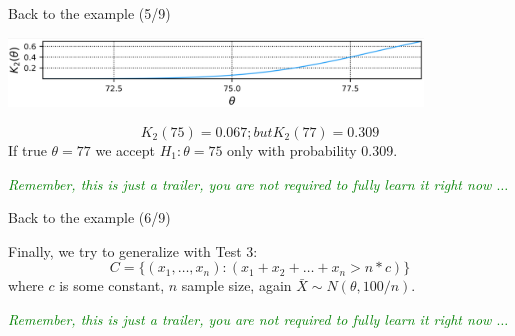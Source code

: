 \documentclass{beamer}
\begin{document}


\begin{frame}
{\centerline{Back to the example (5/9)}}


\begin{center}
  
\includegraphics[width=11cm]{A2022.IDSEPC.SperimentazioneDeduzione/k2.png}
\end{center}

$$K_2(75) = 0.067; but K_2(77) = 0.309$$
If true $\theta = 77$ we accept $H_1: \theta = 75$ only with probability 0.309.

\vspace*{1cm}
\begin{center}
\textcolor{green}{\textit{Remember, this is just a trailer, you are not required to fully learn it right now $\ldots{}$}}
\end{center}

\end{frame}




\begin{frame}
{\centerline{Back to the example (6/9)}}
Finally, we try to generalize with Test 3:
$$C = \{ (x_1,\ldots, x_n): (x_1 + x_2 + \ldots + x_n > n*c) \}$$
where $c$ is some constant, $n$ sample size, again $\bar{X} \sim N(\theta, 100/n)$.

\vspace*{1cm}
\begin{center}
\textcolor{green}{\textit{Remember, this is just a trailer, you are not required to fully learn it right now $\ldots{}$}}
\end{center}

\end{frame}

\end{document}
